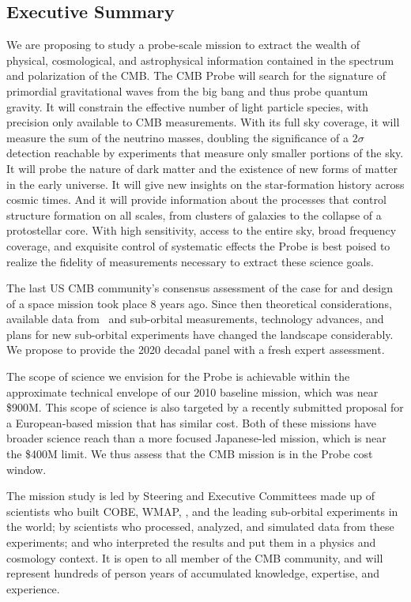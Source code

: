 
\subsection{Executive Summary}
\label{sec:executive}

\vspace{-0.05in}

We are proposing to study a probe-scale mission to extract the wealth 
of physical, cosmological, and astrophysical information contained in the spectrum and polarization of the \ac{CMB}. 
The CMB Probe will search for the signature of primordial gravitational waves from the big bang 
and thus probe quantum gravity. It will constrain the effective 
number of light particle species, with precision only available to CMB measurements. 
With its full sky coverage, it will measure the sum of the neutrino masses, doubling 
the significance of a $2\sigma$ detection reachable 
by experiments that measure only smaller portions of the sky. It will probe 
the nature of dark matter and the existence of new forms of matter in the early universe.  It will 
give new insights on the star-formation history across cosmic times. And it will provide information about 
the processes that control structure formation on all scales, from clusters
of galaxies to the collapse of a protostellar core.    
With high sensitivity, access to the entire sky, broad frequency coverage,  
and exquisite control of systematic effects the Probe is best poised to realize the fidelity of measurements 
necessary to extract these science goals. 

The last US CMB community's consensus assessment of the case for 
and design of a space mission took place 8 years ago. %
Since then theoretical considerations, available data from \planck\ and sub-orbital measurements, technology advances, 
and plans for new sub-orbital experiments have changed the landscape considerably. 
We propose to provide the 2020 decadal panel with a fresh expert assessment. 

The scope of science we envision for the Probe is achievable within the approximate technical 
envelope of our 2010 baseline mission, which was near \$900M. This scope of science 
is also targeted by a recently submitted proposal for a European-based mission that has 
similar cost.  Both of these missions have broader science reach than a 
more focused Japanese-led mission, which 
is near the \$400M limit. We thus assess that the CMB mission is in the Probe cost window. 

The mission study is led by Steering 
and Executive Committees made up of scientists who built COBE, WMAP, \planck , and the 
leading sub-orbital experiments in the world; by scientists who processed, analyzed, and simulated data from 
these experiments; and who interpreted the results and put them in a physics and cosmology context. 
It is open to all member of the CMB community, and will represent hundreds of person years of 
accumulated knowledge, expertise, and experience. 

